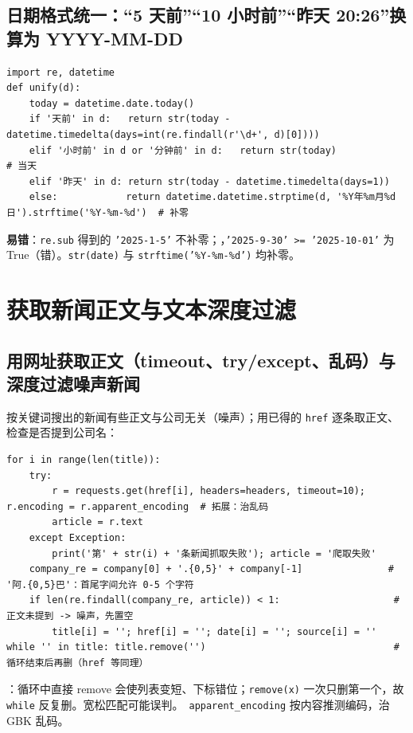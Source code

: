 \subsection{日期格式统一：“5 天前”“10 小时前”“昨天 20:26”换算为 YYYY-MM-DD}
\begin{lstlisting}[style=pyD07]
import re, datetime
def unify(d):
    today = datetime.date.today()
    if '天前' in d:   return str(today - datetime.timedelta(days=int(re.findall(r'\d+', d)[0])))
    elif '小时前' in d or '分钟前' in d:   return str(today)                 # 当天
    elif '昨天' in d: return str(today - datetime.timedelta(days=1))
    else:            return datetime.datetime.strptime(d, '%Y年%m月%d日').strftime('%Y-%m-%d')  # 补零
\end{lstlisting}
\textbf{易错}：\texttt{re.sub} 得到的 \texttt{'2025-1-5'} 不补零；，\texttt{'2025-9-30' >= '2025-10-01'} 为 True（错）。\texttt{str(date)} 与 \texttt{strftime('\%Y-\%m-\%d')} 均补零。

\section{获取新闻正文与文本深度过滤}

\subsection{用网址获取正文（timeout、try/except、乱码）与深度过滤噪声新闻}
按关键词搜出的新闻有些正文与公司无关（噪声）；用已得的 \texttt{href} 逐条取正文、检查是否提到公司名：
\begin{lstlisting}[style=pyD07]
for i in range(len(title)):
    try:
        r = requests.get(href[i], headers=headers, timeout=10); r.encoding = r.apparent_encoding  # 拓展：治乱码
        article = r.text
    except Exception:
        print('第' + str(i) + '条新闻抓取失败'); article = '爬取失败'
    company_re = company[0] + '.{0,5}' + company[-1]               # '阿.{0,5}巴'：首尾字间允许 0-5 个字符
    if len(re.findall(company_re, article)) < 1:                    # 正文未提到 -> 噪声，先置空
        title[i] = ''; href[i] = ''; date[i] = ''; source[i] = ''
while '' in title: title.remove('')                                 # 循环结束后再删（href 等同理）
\end{lstlisting}
：循环中直接 remove 会使列表变短、下标错位；\texttt{remove(x)} 一次只删第一个，故 \texttt{while} 反复删。宽松匹配可能误判。\tagext\ \texttt{apparent\_encoding} 按内容推测编码，治 GBK 乱码。

